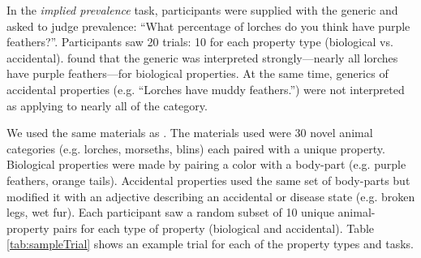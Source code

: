 \documentclass[10pt,letterpaper]{article}
\begin{document}
In the \emph{implied prevalence} task, participants were supplied with the generic and asked to judge prevalence: ``What percentage of lorches do you think have purple feathers?''. Participants saw 20 trials: 10 for each property type (biological vs. accidental).  \citeauthor{Cimpian2010} found that the generic was interpreted strongly---nearly all lorches have purple feathers---for biological properties. At the same time, generics of accidental properties (e.g. ``Lorches have muddy feathers.'') were not interpreted as applying to nearly all of the category.


%
 
We used the same materials as \citeauthor{Cimpian2010}. The materials used were 30 novel animal categories (e.g. lorches, morseths, blins) each paired with a unique property. Biological properties were made by pairing a color with a body-part (e.g. purple feathers, orange tails). Accidental properties used the same set of body-parts but modified it with an adjective describing an accidental or disease state (e.g. broken legs, wet fur). Each participant saw a random subset of 10 unique animal-property pairs for each type of property (biological and accidental). 
Table \ref{tab:sampleTrial} shows an example trial for each of the property types and tasks.
\end{document}
